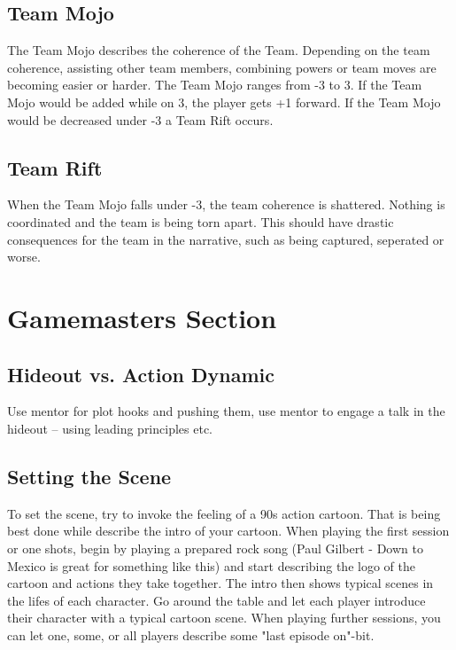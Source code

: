 \documentclass{book}
\begin{document}
\section*{Team Mojo}
The Team Mojo describes the coherence of the Team. Depending on the team coherence, assisting other team members, combining powers or team moves are becoming easier or harder. The Team Mojo ranges from -3 to 3. If the Team Mojo would be added while on 3, the player gets +1 forward. If the Team Mojo would be decreased under -3 a Team Rift occurs.

\section*{Team Rift}
When the Team Mojo falls under -3, the team coherence is shattered. Nothing is coordinated and the team is being torn apart. This should have drastic consequences for the team in the narrative, such as being captured, seperated or worse.

\chapter*{Gamemasters Section}
\section*{Hideout vs. Action Dynamic}
Use mentor for plot hooks and pushing them, use mentor to engage a talk in the hideout -- using leading principles etc.

\section*{Setting the Scene \label{sec:atmosphere}}
To set the scene, try to invoke the feeling of a 90s action cartoon. That is being best done while describe the intro of your cartoon. When playing the first session or one shots, begin by playing a prepared rock song (Paul Gilbert - Down to Mexico is great for something like this) and start describing the logo of the cartoon and actions they take together. The intro then shows typical scenes in the lifes of each character. Go around the table and let each player introduce their character with a typical cartoon scene. When playing further sessions, you can let one, some, or all players describe some "last episode on"-bit.
\end{document}
